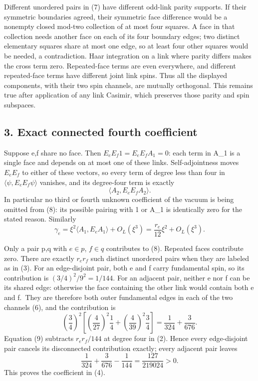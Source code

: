 \documentclass[
  11pt,
]{article}
\begin{document}
Different unordered pairs in (7) have different odd-link parity
supports. If their symmetric boundaries agreed, their symmetric face
difference would be a nonempty closed mod-two collection of at most four
squares. A face in that collection needs another face on each of its
four boundary edges; two distinct elementary squares share at most one
edge, so at least four other squares would be needed, a contradiction.
Haar integration on a link where parity differs makes the cross term
zero. Repeated-face terms are even everywhere, and different
repeated-face terms have different joint link spins. Thus all the
displayed components, with their two spin channels, are mutually
orthogonal. This remains true after application of any link Casimir,
which preserves those parity and spin subspaces.

\subsection{3. Exact connected fourth
coefficient}\label{magnetic-part-10-exact-connected-fourth-coefficient}

Suppose e,f share no face. Then \(E_eE_f1=E_eE_fA_1=0\): each term in
A\_1 is a single face and depends on at most one of these links.
Self-adjointness moves \(E_eE_f\) to either of these vectors, so every
term of degree less than four in \(\langle\psi,E_eE_f\psi\rangle\)
vanishes, and its degree-four term is exactly \[
 \langle A_2,E_eE_fA_2\rangle.
\tag{8}
\] In particular no third or fourth unknown coefficient of the vacuum is
being omitted from (8): its possible pairing with 1 or A\_1 is
identically zero for the stated reason. Similarly \[
 \gamma_e=\xi^2\langle A_1,E_eA_1\rangle+O_L(\xi^3)
          =\frac{r_e}{12}\xi^2+O_L(\xi^3).
\tag{9}
\]

Only a pair p,q with \(e\in p\), \(f\in q\) contributes to (8). Repeated
faces contribute zero. There are exactly \(r_er_f\) such distinct
unordered pairs when they are labeled as in (3). For an edge-disjoint
pair, both e and f carry fundamental spin, so its contribution is
\((3/4)^2/9^2=1/144\). For an adjacent pair, neither e nor f can be its
shared edge: otherwise the face containing the other link would contain
both e and f.~They are therefore both outer fundamental edges in each of
the two channels (6), and the contribution is \[
 \left(\frac34\right)^2
 \left[\left(\frac4{27}\right)^2\frac14
       +\left(\frac4{39}\right)^2\frac34\right]
       =\frac1{324}+\frac3{676}.
\tag{10}
\] Equation (9) subtracts \(r_er_f/144\) at degree four in (2). Hence
every edge-disjoint pair cancels its disconnected contribution exactly;
every adjacent pair leaves \[
 \frac1{324}+\frac3{676}-\frac1{144}
          =\frac{127}{219024}>0.
\tag{11}
\] This proves the coefficient in (4).
\end{document}
